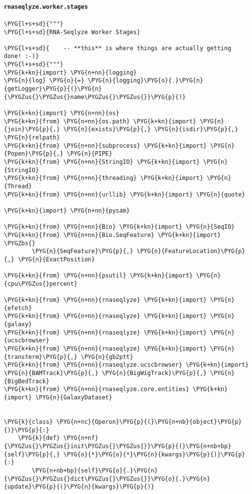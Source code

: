 \paragraph{\texttt{rnaseqlyze.worker.stages}}
\label{index-pdf4:rnaseqlyze-worker-stages}
\begin{Verbatim}[commandchars=\\\{\}]
\PYG{l+s+sd}{"""}
\PYG{l+s+sd}{RNA-Seqlyze Worker Stages}

\PYG{l+s+sd}{    -- **this** is where things are actually getting done! :-)}
\PYG{l+s+sd}{"""}
\PYG{k+kn}{import} \PYG{n+nn}{logging}
\PYG{n}{log} \PYG{o}{=} \PYG{n}{logging}\PYG{o}{.}\PYG{n}{getLogger}\PYG{p}{(}\PYG{n}{\PYGZus{}\PYGZus{}name\PYGZus{}\PYGZus{}}\PYG{p}{)}

\PYG{k+kn}{import} \PYG{n+nn}{os}
\PYG{k+kn}{from} \PYG{n+nn}{os.path} \PYG{k+kn}{import} \PYG{n}{join}\PYG{p}{,} \PYG{n}{exists}\PYG{p}{,} \PYG{n}{isdir}\PYG{p}{,} \PYG{n}{relpath}
\PYG{k+kn}{from} \PYG{n+nn}{subprocess} \PYG{k+kn}{import} \PYG{n}{Popen}\PYG{p}{,} \PYG{n}{PIPE}
\PYG{k+kn}{from} \PYG{n+nn}{StringIO} \PYG{k+kn}{import} \PYG{n}{StringIO}
\PYG{k+kn}{from} \PYG{n+nn}{threading} \PYG{k+kn}{import} \PYG{n}{Thread}
\PYG{k+kn}{from} \PYG{n+nn}{urllib} \PYG{k+kn}{import} \PYG{n}{quote}

\PYG{k+kn}{import} \PYG{n+nn}{pysam}

\PYG{k+kn}{from} \PYG{n+nn}{Bio} \PYG{k+kn}{import} \PYG{n}{SeqIO}
\PYG{k+kn}{from} \PYG{n+nn}{Bio.SeqFeature} \PYG{k+kn}{import} \PYGZbs{}
        \PYG{n}{SeqFeature}\PYG{p}{,} \PYG{n}{FeatureLocation}\PYG{p}{,} \PYG{n}{ExactPosition}

\PYG{k+kn}{from} \PYG{n+nn}{psutil} \PYG{k+kn}{import} \PYG{n}{cpu\PYGZus{}percent}

\PYG{k+kn}{from} \PYG{n+nn}{rnaseqlyze} \PYG{k+kn}{import} \PYG{n}{efetch}
\PYG{k+kn}{from} \PYG{n+nn}{rnaseqlyze} \PYG{k+kn}{import} \PYG{n}{galaxy}
\PYG{k+kn}{from} \PYG{n+nn}{rnaseqlyze} \PYG{k+kn}{import} \PYG{n}{ucscbrowser}
\PYG{k+kn}{from} \PYG{n+nn}{rnaseqlyze} \PYG{k+kn}{import} \PYG{n}{transterm}\PYG{p}{,} \PYG{n}{gb2ptt}
\PYG{k+kn}{from} \PYG{n+nn}{rnaseqlyze.ucscbrowser} \PYG{k+kn}{import} \PYG{n}{BAMTrack}\PYG{p}{,} \PYG{n}{BigWigTrack}\PYG{p}{,} \PYG{n}{BigBedTrack}
\PYG{k+kn}{from} \PYG{n+nn}{rnaseqlyze.core.entities} \PYG{k+kn}{import} \PYG{n}{GalaxyDataset}


\PYG{k}{class} \PYG{n+nc}{Operon}\PYG{p}{(}\PYG{n+nb}{object}\PYG{p}{)}\PYG{p}{:}
    \PYG{k}{def} \PYG{n+nf}{\PYGZus{}\PYGZus{}init\PYGZus{}\PYGZus{}}\PYG{p}{(}\PYG{n+nb+bp}{self}\PYG{p}{,} \PYG{o}{*}\PYG{o}{*}\PYG{n}{kwargs}\PYG{p}{)}\PYG{p}{:}
        \PYG{n+nb+bp}{self}\PYG{o}{.}\PYG{n}{\PYGZus{}\PYGZus{}dict\PYGZus{}\PYGZus{}}\PYG{o}{.}\PYG{n}{update}\PYG{p}{(}\PYG{n}{kwargs}\PYG{p}{)}


\end{Verbatim}
